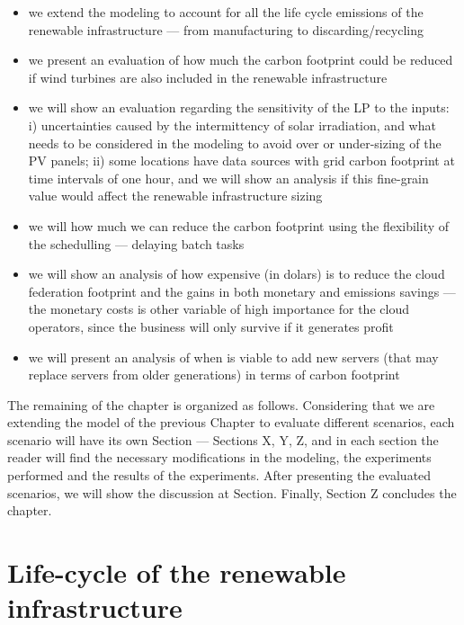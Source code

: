 \begin{itemize}
 
\item we extend the modeling to account for all the life cycle emissions of the renewable infrastructure --- from manufacturing to discarding/recycling

\item we present an evaluation of how much the carbon footprint could be reduced if wind turbines are also included in the renewable infrastructure 

\item we will show an evaluation regarding the sensitivity of the LP to the inputs: i) uncertainties caused by the intermittency of solar irradiation, and what needs to be considered in the modeling to avoid over or under-sizing of the PV panels; ii) some locations have data sources with grid carbon footprint at time intervals of one hour, and we will show an analysis if this fine-grain value would affect the renewable infrastructure sizing
  
\item we will how much we can reduce the carbon footprint using the flexibility of the schedulling --- delaying batch tasks 
 
\item we will show an analysis of how expensive (in dolars) is to reduce the cloud federation footprint and the gains in both monetary and emissions savings --- the monetary costs is other variable of high importance for the cloud operators, since the business will only survive if it generates profit

\item we will present an analysis of when is viable to add new servers (that may replace servers from older generations) in terms of carbon footprint

 
\end{itemize}

The remaining of the chapter is organized as follows. Considering that we are extending the model of the previous Chapter to evaluate different scenarios, each scenario will have its own Section --- Sections X, Y, Z, and in each section the reader will find the necessary modifications in the modeling, the experiments performed and the results of the experiments. After presenting the evaluated scenarios, we will show the discussion at Section. Finally, Section Z concludes the chapter.

\section{Life-cycle of the renewable infrastructure}

